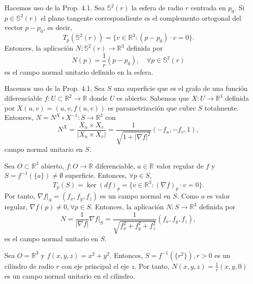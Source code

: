 \begin{ejm}[Esfera]
  Hacemos uso de la Prop. 4.1. Sea $\mathbb{S}^{2}(r)$ la esfera de radio $r$ centrada en $p_{0}$. Si $p \in \mathbb{S}^{2}(r)$ el plano tangente correspondiente es el complemento ortogonal del vector $p -p_{0}$, es decir,
  \[ 
    T_{p}(\mathbb{S}^{2}(r)) = \{ v \in \mathbb{R}^{3} : (p - p_{0}) \cdot v = 0 \} .
  \]
  Entonces, la aplicación $N : \mathbb{S}^{2}(r) \to \mathbb{R}^{3}$ definida por
  \[ 
    N(p) = \frac{1}{r}(p - p_{0}), \quad \forall p \in \mathbb{S}^{2}(r)
  \] 
  es el campo normal unitario definido en la esfera.
\end{ejm}

\begin{ejm}[Grafo]
  Hacemos uso de la Prop. 4.1. Sea $S$ una superficie que es el grafo de una función diferenciable $f : U \subset \mathbb{R}^{2} \to \mathbb{R}$ donde $U$ es abierto. Sabemos que $X : U \to \mathbb{R}^{3}$ definida por $X(u, v) = (u, v, f(u, v))$ es parametrización que cubre $S$ totalmente. Entonces, $N = N^{X} \circ X^{-1} : S \to \mathbb{R}^{3}$ con
  \[ 
    N^{X} = \frac{X_{u} \times X_{v}}{| X_{u} \times X_{v}|} = \frac{1}{\sqrt{1 + | \nabla f |^{2}}}(-f_{u}, - f_{v}, 1),
  \] 
  campo normal unitario en $S$.
\end{ejm}

\begin{ejm}
  Sea $O \subset \mathbb{R}^{3}$ abierto, $f : O \to \mathbb{R}$ diferenciable, $a \in \mathbb{R}$ valor regular de $f$ y $S = f^{-1}(\{ a \}) \neq \emptyset$ superficie. Entonces, $\forall p \in S$,
  \[ 
    T_{p}(S) = \ker (d f)_{p} = \{  v \in \mathbb{R}^{3} : (\nabla f)_{p} \cdot v = 0 \}.
  \] 
  Por tanto, $\nabla f|_{S} = (f_{x}, f_{y}, f_{z})$ es un campo normal en $S$. Como $a$ es valor regular, $\nabla f (p) \neq 0, \forall p \in S$. Entonces, la aplicación $N : S \to \mathbb{R}^{3}$ definida por
  \[ 
    N = \frac{1}{|  \nabla f |}\nabla f |_{S} = \frac{1}{\sqrt{f_{x}^{2} + f_{y}^{2} + f_{z}^{2}}}(f_{x}, f_{y}, f_{z}),
  \] 
   es el campo normal unitario en $S$.
\end{ejm}

\begin{ejm}[Cilindro]
  Sea $O = \mathbb{R}^{3}$ y $f(x, y, z) = x^{2} + y^{2}$. Entonces, $S = f^{-1}(\{ r ^{2} \}), r >0$ es un cilindro de radio $r$ con eje principal el eje $z$. Por tanto, $N(x, y, z) = \frac{1}{r}(x, y, 0)$ es un campo normal unitario en el cilindro.
\end{ejm}

